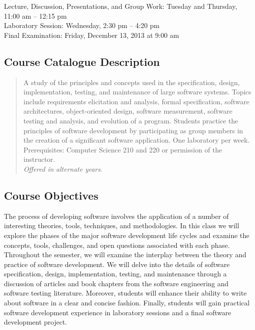 Lecture, Discussion, Presentations, and Group Work: Tuesday and Thursday, 11:00 am -- 12:15 pm \\
Laboratory Session: Wednesday, 2:30 pm -- 4:20 pm \\
Final Examination: Friday, December 13, 2013 at 9:00 am


\subsection*{Course Catalogue Description}

\begin{quote}

	A study of the principles and concepts used in the specification, design, implementation, testing, and maintenance
	of large software systems. Topics include requirements elicitation and analysis, formal specification, software
	architectures, object-oriented design, software measurement, software testing and analysis, and evolution of a
	program.  Students practice the principles of software development by participating as group members in the creation
	of a significant software application. One laboratory per week. Prerequisites: Computer Science 210 and 220 or
	permission of the instructor. \\ {\em Offered in alternate years}.

\end{quote}

\subsection*{Course Objectives}

The process of developing software involves the application of a number of interesting theories, tools, techniques, and
methodologies.  In this class we will explore the phases of the major software development life cycles and examine the
concepts, tools, challenges, and open questions associated with each phase.  Throughout the semester, we will
examine the interplay between the theory and practice of software development.  We will delve into the details of
software specification, design, implementation, testing, and maintenance through a discussion of articles and book
chapters from the software engineering and software testing literature.  Moreover, students will enhance their ability
to write about software in a clear and concise fashion.  Finally, students will gain practical software development
experience in laboratory sessions and a final software development project.

